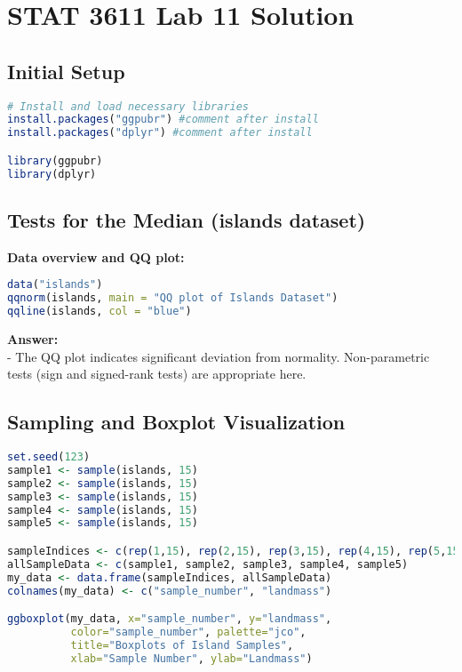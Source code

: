 \documentclass{article}
\begin{document}
\section*{STAT 3611 Lab 11 Solution}

\subsection*{Initial Setup}
\begin{lstlisting}[language=R]
# Install and load necessary libraries
install.packages("ggpubr") #comment after install
install.packages("dplyr") #comment after install

library(ggpubr)
library(dplyr)
\end{lstlisting}

\subsection*{Tests for the Median (islands dataset)}

\textbf{Data overview and QQ plot:}

\begin{lstlisting}[language=R]
data("islands")
qqnorm(islands, main = "QQ plot of Islands Dataset")
qqline(islands, col = "blue")
\end{lstlisting}

\textbf{Answer:}\\
- The QQ plot indicates significant deviation from normality. Non-parametric tests (sign and signed-rank tests) are appropriate here.

\subsection*{Sampling and Boxplot Visualization}

\begin{lstlisting}[language=R]
set.seed(123)
sample1 <- sample(islands, 15)
sample2 <- sample(islands, 15)
sample3 <- sample(islands, 15)
sample4 <- sample(islands, 15)
sample5 <- sample(islands, 15)

sampleIndices <- c(rep(1,15), rep(2,15), rep(3,15), rep(4,15), rep(5,15))
allSampleData <- c(sample1, sample2, sample3, sample4, sample5)
my_data <- data.frame(sampleIndices, allSampleData)
colnames(my_data) <- c("sample_number", "landmass")

ggboxplot(my_data, x="sample_number", y="landmass",
          color="sample_number", palette="jco",
          title="Boxplots of Island Samples",
          xlab="Sample Number", ylab="Landmass")
\end{lstlisting}
\end{document}
